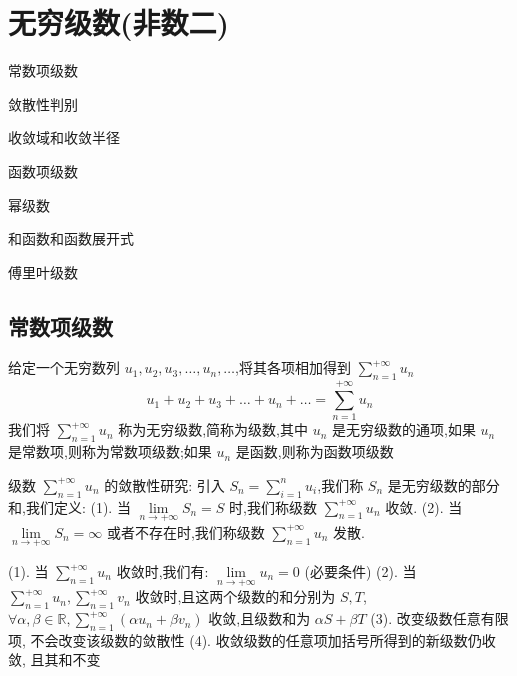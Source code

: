 \chapter{无穷级数(非数二)}
\begin{introduction}
	\item 常数项级数
	\item 敛散性判别
	\item 收敛域和收敛半径
	\item 函数项级数
	\item 幂级数
	\item 和函数和函数展开式
	\item 傅里叶级数
\end{introduction}
\section{常数项级数}

\begin{definition}[级数定义]
	给定一个无穷数列 $u_{1},u_{2},u_{3},\dots,u_{n},\dots$,将其各项相加得到 $\sum\limits_{n=1}^{+\infty}u_{n}$
	$$u_{1}+u_{2}+u_{3}+\dots+u_{n}+\dots=\sum_{n=1}^{+\infty}u_{n}$$
	我们将 $\sum\limits_{n=1}^{+\infty}u_{n}$ 称为无穷级数,简称为级数,其中 $u_{n}$ 是无穷级数的通项,如果 $u_{n}$ 是常数项,则称为常数项级数;如果 $u_{n}$ 是函数,则称为函数项级数
\end{definition}
\begin{definition}[级数敛散性]
	级数 $\sum\limits_{n=1}^{+\infty}u_{n}$ 的敛散性研究:
	引入 $S_{n}=\sum\limits_{i=1}^{n}u_{i}$,我们称 $S_{n}$ 是无穷级数的部分和,我们定义:
	(1). 当 $\lim\limits_{n\to +\infty}S_{n}=S$ 时,我们称级数 $\sum\limits_{n=1}^{+\infty}u_{n}$ 收敛.
	(2). 当 $\lim\limits_{n\to +\infty}S_{n}=\infty$ 或者不存在时,我们称级数 $\sum\limits_{n=1}^{+\infty}u_{n}$ 发散.
\end{definition}

\begin{corollary}
	(1). 当 $\sum\limits_{n=1}^{+\infty}u_{n}$ 收敛时,我们有:  $\lim\limits_{n\to +\infty}u_{n}=0$ (必要条件)
	(2). 当 $\sum\limits_{n=1}^{+\infty}u_{n},\sum\limits_{n=1}^{+\infty}v_{n}$ 收敛时,且这两个级数的和分别为 $S,T$, $\forall \alpha ,\beta \in \mathbb{R} ,\sum\limits_{n=1}^{+\infty}(\alpha u_{n}+\beta v_{n})$ 收敛,且级数和为 $\alpha S+\beta T$
	(3). 改变级数任意有限项, 不会改变该级数的敛散性
	(4). 收敛级数的任意项加括号所得到的新级数仍收敛, 且其和不变
\end{corollary}

